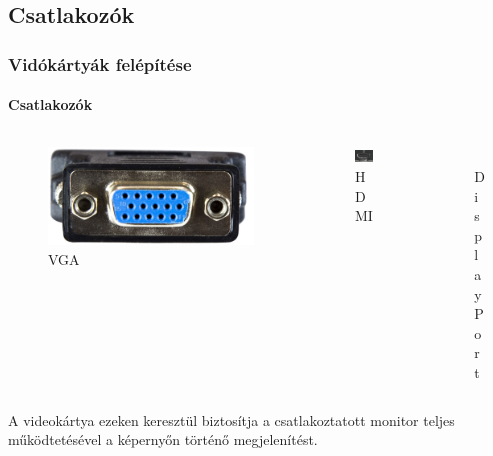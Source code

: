 \documentclass[tikz,border=10pt]{beamer}
\begin{document}
\subsection{Csatlakozók}
\begin{frame}
\frametitle{Vidókártyák felépítése}
\framesubtitle{Csatlakozók}
\transwipe[direction=90]
\begin{columns}[onlytextwidth]
\begin{column}{0.3\textwidth}
\begin{figure}
\centering
\includegraphics[scale=.075]{media/vga.jpg}
\caption{VGA}
\end{figure}
\end{column}

\begin{column}{0.3\textwidth}
\begin{figure}
\centering
\includegraphics[scale=.25]{media/hdmi.jpg}
\caption{HDMI}
\end{figure}
\end{column}

\begin{column}{0.3\textwidth}
\begin{figure}
\centering
\includegraphics[scale=.45]{media/dp.jpeg}
\caption{DisplayPort}
\end{figure}
\end{column}

\bigskip
\end{columns}
A
videokártya ezeken keresztül biztosítja a csatlakoztatott monitor teljes működtetésével a
képernyőn történő megjelenítést.
\end{frame}
\end{document}
